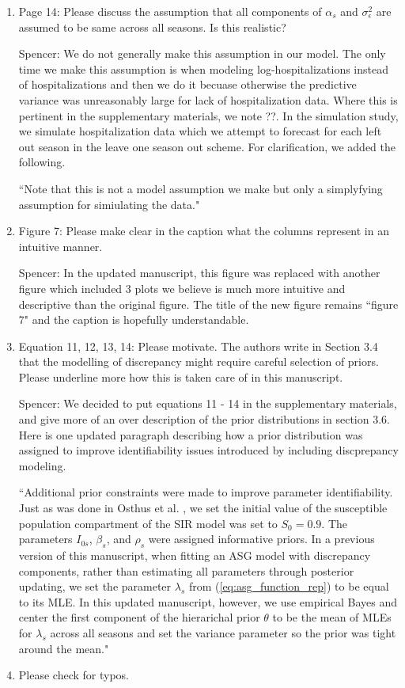 \documentclass{article}
\newcommand{\spencer}[1]{{\color{blue} Spencer: #1}}
\begin{document}
\begin{enumerate}[-]
\item Page 14: Please discuss the assumption that all components of $\alpha_s$ and 
$\sigma_\epsilon^2$ are assumed to be same across all seasons. Is this realistic?

\spencer{We do not generally make this assumption in our model. The only time
we make this assumption is when modeling log-hospitalizations instead of 
hospitalizations and then we do it becuase otherwise the predictive variance
was unreasonably large for lack of hospitalization data.
Where this is pertinent in the supplementary materials, we note ??.
In the simulation study,
we simulate hospitalization data which we attempt to forecast for each left
out season in the leave one season out scheme. For clarification, we added 
the following.

``Note that this is not
a model assumption we make but only a simplyfying assumption for simiulating
the data."}

\item Figure 7: Please make clear in the caption what the columns represent in an 
intuitive manner. 

\spencer{In the updated manuscript, this figure was replaced with another figure
which included 3 plots we believe is much more intuitive and descriptive than
the original figure. The title of the new figure remains ``figure 7" and 
the caption is hopefully understandable.}

\item Equation 11, 12, 13, 14: Please motivate. The authors write in Section 3.4 
that the modelling of discrepancy might require careful selection of priors. 
Please underline more how this is taken care of in this manuscript.

\spencer{We decided to put equations 11 - 14 in the supplementary materials, and
give more of an over description of the prior distributions in section 3.6. Here
is one updated paragraph describing how a prior distribution was assigned to
improve identifiability issues introduced by including discprepancy modeling.

``Additional prior constraints were made to improve parameter identifiability. 
Just as was done in Osthus et al. \cite[]{osthus2019dynamic},
we set the initial value of the 
susceptible population compartment of the SIR model was set to $S_0 = 0.9$. 
The parameters $I_{0s}$, $\beta_s$, and $\rho_s$ were assigned informative 
priors. In a previous version of this manuscript, when fitting an ASG model
with discrepancy components,
rather than estimating all parameters through posterior updating,
we set the parameter $\lambda_s$ from (\ref{eq:asg_function_rep})
to be equal to its MLE. In this updated manuscript, 
however, we use empirical Bayes and center the first component of the 
hierarichal prior $\theta$ to be the mean of MLEs for $\lambda_s$ across
all seasons and set the variance parameter so the prior was tight around the
mean."}

\item Please check for typos.
  
\end{enumerate}
\end{document}
